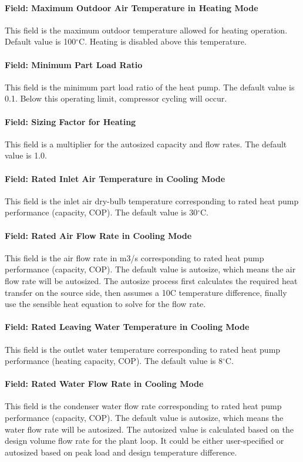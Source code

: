 \paragraph{Field: Maximum Outdoor Air Temperature in Heating Mode} This field is
the maximum outdoor temperature allowed for heating operation. Default value is
100$^\circ$C. Heating is disabled above this temperature.
\paragraph{Field: Minimum Part Load Ratio} This field is the minimum part load
ratio of the heat pump. The default value is 0.1. Below this operating limit,
compressor cycling will occur.
\paragraph{Field: Sizing Factor for Heating} This field is a multiplier for the
autosized capacity and flow rates. The default value is 1.0.
\paragraph{Field: Rated Inlet Air Temperature in Cooling Mode} This field is the
inlet air dry-bulb temperature corresponding to rated heat pump performance
(capacity, COP). The default value is 30$^\circ$C.
\paragraph{Field: Rated Air Flow Rate in Cooling Mode} This field is the air
flow rate in m3/s corresponding to rated heat pump performance (capacity, COP).
The default value is autosize, which means the air flow rate will be autosized.
The autosize process first calculates the required heat transfer on the source
side, then assumes a 10C temperature difference, finally use the sensible heat
equation to solve for the flow rate.
\paragraph{Field: Rated Leaving Water Temperature in Cooling Mode} This field is
the outlet water temperature corresponding to rated heat pump performance
(heating capacity, COP). The default value is 8$^\circ$C.
\paragraph{Field: Rated Water Flow Rate in Cooling Mode} This field is the
condenser water flow rate corresponding to rated heat pump performance
(capacity, COP). The default value is autosize, which means the water flow rate
will be autosized. The autosized value is calculated based on the design volume
flow rate for the plant loop. It could be either user-specified or autosized based 
on peak load and design temperature difference.
